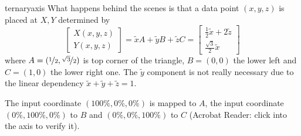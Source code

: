 \begin{environment}{{ternaryaxis}}
    What happens behind the scenes is that a data point $(x,y,z)$ is placed at
    $X,Y$ determined by
        \[
            \begin{bmatrix}
                X(x,y,z)\\
                Y(x,y,z)
            \end{bmatrix}
            =
            \tilde x A + \tilde y B + \tilde z C
            =
            \begin{bmatrix}
                \frac12 {\tilde x+2 \tilde z}\\
                \frac{\sqrt 3}{2} {\tilde x}
            \end{bmatrix}
        \]
    where $A=(\nicefrac12,\nicefrac{\sqrt3}{2})$ is top corner of the triangle,
    $B=(0,0)$ the lower left and $C=(1,0)$ the lower right one. The $\tilde y$
    component is not really necessary due to the linear dependency $\tilde
    x+\tilde y+\tilde z=1$.

    The input coordinate $(100\%,0\%,0\%)$ is mapped to $A$, the input
    coordinate $(0\%,100\%,0\%)$ to $B$ and $(0\%,0\%,100\%)$ to $C$ (Acrobat
    Reader: click into the axis to verify it).
\begin{codeexample}[]
\end{codeexample}
\end{environment}

